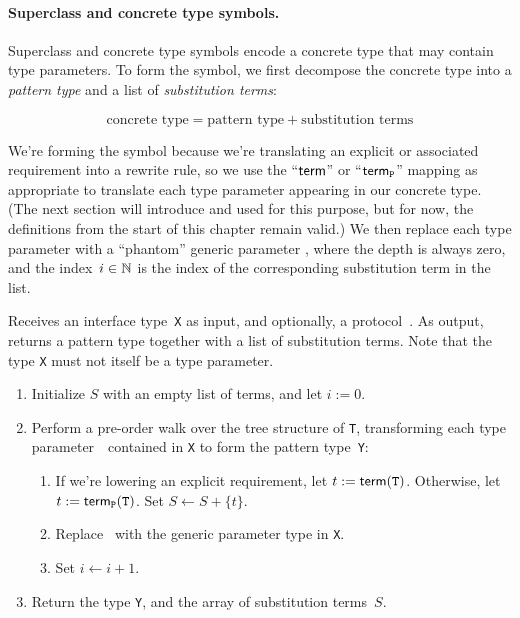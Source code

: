 \documentclass[../generics]{subfiles}
\begin{document}
\paragraph{Superclass and concrete type symbols.}
Superclass and concrete type symbols encode a concrete type that may contain type parameters. To form the symbol, we first decompose the concrete type into a \emph{pattern type} and a list of \emph{substitution terms}:
\begin{ceqn}
\[\text{concrete type} = \text{pattern type} + \text{substitution terms}\]
\end{ceqn}
We're forming the symbol because we're translating an explicit or associated requirement into a rewrite rule, so we use the ``$\mathsf{term}$'' or ``$\mathsf{term}_{\texttt{P}}$'' mapping as appropriate to translate each type parameter appearing in our concrete type. (The next section will introduce  and  used for this purpose, but for now, the definitions from the start of this chapter remain valid.) We then replace each type parameter with a ``phantom'' generic parameter , where the depth is always zero, and the index~$i\in\mathbb{N}$ is the index of the corresponding substitution term in the list.

\begin{algorithm}\label{concretesymbolcons}
Receives an interface type~\texttt{X} as input, and optionally, a protocol~\tP. As output, returns a pattern type together with a list of substitution terms. Note that the type \texttt{X} must not itself be a type parameter.
\begin{enumerate}
\item Initialize $S$ with an empty list of terms, and let $i:=0$.
\item Perform a pre-order walk over the tree structure of \texttt{T}, transforming each type parameter~\tT\ contained in \texttt{X} to form the pattern type~\texttt{Y}:
\begin{enumerate}
\item If we're lowering an explicit requirement, let $t := \mathsf{term}(\texttt{T})$. Otherwise, let $t := \mathsf{term}_{\texttt{P}}(\texttt{T})$. Set $S\leftarrow S + \{t\}$.
\item Replace \tT\ with the generic parameter type  in \texttt{X}.
\item Set $i\leftarrow i + 1$.
\end{enumerate}
\item Return the type \texttt{Y}, and the array of substitution terms~$S$.
\end{enumerate}
\end{algorithm}
\end{document}
